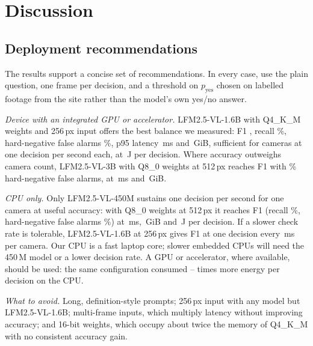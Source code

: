 \section{Discussion}
\label{sec:discussion}

\subsection{Deployment recommendations}
The results support a concise set of recommendations. In every case, use the plain question, one frame per decision, and a threshold on $p_\text{yes}$ chosen on labelled footage from the site rather than the model's own yes/no answer.

\textit{Device with an integrated GPU or accelerator.} LFM2.5-VL-1.6B with Q4\_K\_M weights and 256\,px input offers the best balance we measured: F1 \CLfmMQfourTwofiftysixOneFone, recall \CLfmMQfourTwofiftysixOneRecall\%, hard-negative false alarms \CLfmMQfourTwofiftysixOneFarHard\%, p95 latency \CLfmMQfourTwofiftysixOnePtf\,ms and \CLfmMQfourTwofiftysixOneRss\,GiB, sufficient for \CLfmMQfourTwofiftysixOneStreams{} cameras at one decision per second each, at \PLfmMQfourTwofiftysixOneGpuJ\,J per decision. Where accuracy outweighs camera count, LFM2.5-VL-3B with Q8\_0 weights at 512\,px reaches F1 \CLfmLQeightFivetwelveOneFone{} with \CLfmLQeightFivetwelveOneFarHard\% hard-negative false alarms, at \CLfmLQeightFivetwelveOnePtf\,ms and \CLfmLQeightFivetwelveOneRss\,GiB.

\textit{CPU only.} Only LFM2.5-VL-450M sustains one decision per second for one camera at useful accuracy: with Q8\_0 weights at 512\,px it reaches F1 \CLfmSQeightFivetwelveOneFone{} (recall \CLfmSQeightFivetwelveOneRecall\%, hard-negative false alarms \CLfmSQeightFivetwelveOneFarHard\%) at \CLfmSQeightFivetwelveOneCpuPtf\,ms, \CLfmSQeightFivetwelveOneRss\,GiB and \PLfmSQeightFivetwelveOneCpuJ\,J per decision. If a slower check rate is tolerable, LFM2.5-VL-1.6B at 256\,px gives F1 \CLfmMQfourTwofiftysixOneFone{} at one decision every \CLfmMQfourTwofiftysixOneCpuPtf\,ms per camera. Our CPU is a fast laptop core; slower embedded CPUs will need the 450\,M model or a lower decision rate. A GPU or accelerator, where available, should be used: the same configuration consumed \PCpuGpuRatioMin--\PCpuGpuRatioMax{} times more energy per decision on the CPU.

\textit{What to avoid.} Long, definition-style prompts; 256\,px input with any model but LFM2.5-VL-1.6B; multi-frame inputs, which multiply latency without improving accuracy; and 16-bit weights, which occupy about twice the memory of Q4\_K\_M with no consistent accuracy gain.

